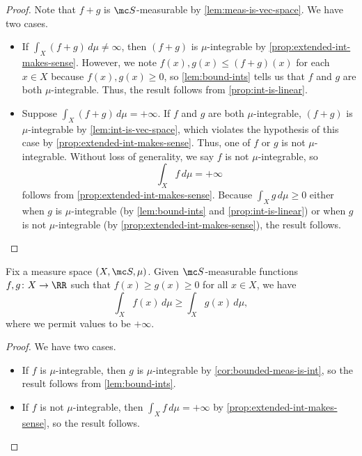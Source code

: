 \documentclass[../notes.tex]{subfiles}
\begin{document}
\begin{proof}
	Note that $f+g$ is $\mc S$-measurable by \autoref{lem:meas-is-vec-space}. We have two cases.
	\begin{itemize}
		\item If $\int_X(f+g)\,d\mu\ne\infty$, then $(f+g)$ is $\mu$-integrable by \autoref{prop:extended-int-makes-sense}. However, we note $f(x),g(x)\le(f+g)(x)$ for each $x\in X$ because $f(x),g(x)\ge0$, so \autoref{lem:bound-ints} tells us that $f$ and $g$ are both $\mu$-integrable. Thus, the result follows from \autoref{prop:int-is-linear}.
		\item Suppose $\int_X(f+g)\,d\mu=+\infty$. If $f$ and $g$ are both $\mu$-integrable, $(f+g)$ is $\mu$-integrable by \autoref{lem:int-is-vec-space}, which violates the hypothesis of this case by \autoref{prop:extended-int-makes-sense}. Thus, one of $f$ or $g$ is not $\mu$-integrable. Without loss of generality, we say $f$ is not $\mu$-integrable, so
		\[\int_Xf\,d\mu=+\infty\]
		follows from \autoref{prop:extended-int-makes-sense}. Because $\int_Xg\,d\mu\ge0$ either when $g$ is $\mu$-integrable (by \autoref{lem:bound-ints} and \autoref{prop:int-is-linear}) or when $g$ is not $\mu$-integrable (by \autoref{prop:extended-int-makes-sense}), the result follows.
		\qedhere
	\end{itemize}
\end{proof}
\begin{lemma} \label{lem:bound-extended-int}
	Fix a measure space $(X,\mc S,\mu)$. Given $\mc S$-measurable functions $f,g\colon X\to\RR$ such that $f(x)\ge g(x)\ge0$ for all $x\in X$, we have
	\[\int_Xf(x)\,d\mu\ge\int_Xg(x)\,d\mu,\]
	where we permit values to be $+\infty$.
\end{lemma}
\begin{proof}
	We have two cases.
	\begin{itemize}
		\item If $f$ is $\mu$-integrable, then $g$ is $\mu$-integrable by \autoref{cor:bounded-meas-is-int}, so the result follows from \autoref{lem:bound-ints}.
		\item If $f$ is not $\mu$-integrable, then $\int_Xf\,d\mu=+\infty$ by \autoref{prop:extended-int-makes-sense}, so the result follows.
		\qedhere
	\end{itemize}
\end{proof}
\end{document}
